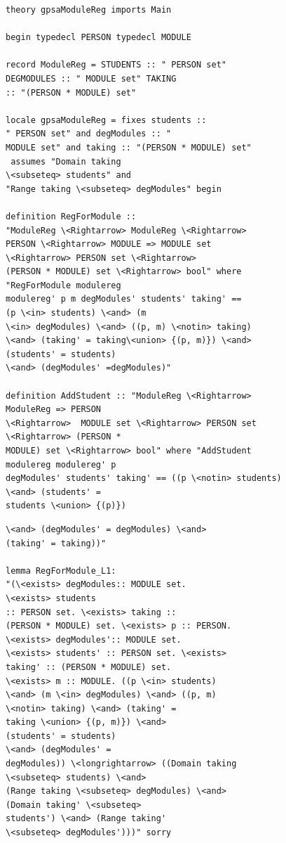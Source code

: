 \begin{figure}[H]
\centering
\begin{minipage}{0.45\textwidth}
\centering
\begin{scriptsize}
\begin{BVerbatim}
theory gpsaModuleReg imports Main 

begin typedecl PERSON typedecl MODULE

record ModuleReg = STUDENTS :: " PERSON set"
DEGMODULES :: " MODULE set" TAKING
:: "(PERSON * MODULE) set"

locale gpsaModuleReg = fixes students :: 
" PERSON set" and degModules :: "
MODULE set" and taking :: "(PERSON * MODULE) set"
 assumes "Domain taking
\<subseteq> students" and 
"Range taking \<subseteq> degModules" begin

definition RegForModule :: 
"ModuleReg \<Rightarrow> ModuleReg \<Rightarrow>
PERSON \<Rightarrow> MODULE => MODULE set 
\<Rightarrow> PERSON set \<Rightarrow>
(PERSON * MODULE) set \<Rightarrow> bool" where 
"RegForModule modulereg
modulereg' p m degModules' students' taking' == 
(p \<in> students) \<and> (m
\<in> degModules) \<and> ((p, m) \<notin> taking) 
\<and> (taking' = taking\<union> {(p, m)}) \<and> 
(students' = students) 
\<and> (degModules' =degModules)"

definition AddStudent :: "ModuleReg \<Rightarrow> 
ModuleReg => PERSON
\<Rightarrow>  MODULE set \<Rightarrow> PERSON set 
\<Rightarrow> (PERSON *
MODULE) set \<Rightarrow> bool" where "AddStudent 
modulereg modulereg' p
degModules' students' taking' == ((p \<notin> students) 
\<and> (students' =
students \<union> {(p)}) 
\end{BVerbatim}
\end{scriptsize}
\end{minipage}\hfill
\begin{minipage}{0.45\textwidth}
\begin{scriptsize}
\begin{BVerbatim}
\<and> (degModules' = degModules) \<and> 
(taking' = taking))"

lemma RegForModule_L1: 
"(\<exists> degModules:: MODULE set. 
\<exists> students
:: PERSON set. \<exists> taking :: 
(PERSON * MODULE) set. \<exists> p :: PERSON.
\<exists> degModules':: MODULE set. 
\<exists> students' :: PERSON set. \<exists>
taking' :: (PERSON * MODULE) set. 
\<exists> m :: MODULE. ((p \<in> students)
\<and> (m \<in> degModules) \<and> ((p, m) 
\<notin> taking) \<and> (taking' =
taking \<union> {(p, m)}) \<and> 
(students' = students) 
\<and> (degModules' =
degModules)) \<longrightarrow> ((Domain taking 
\<subseteq> students) \<and>
(Range taking \<subseteq> degModules) \<and> 
(Domain taking' \<subseteq>
students') \<and> (Range taking' 
\<subseteq> degModules')))" sorry


\end{BVerbatim}
\end{scriptsize}
\end{minipage}
\end{figure}
